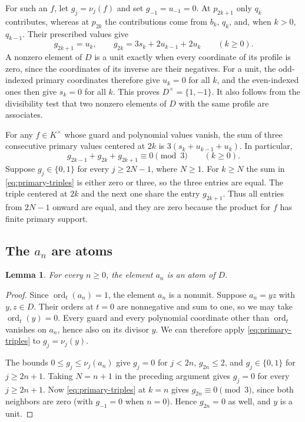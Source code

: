 \documentclass{article}
\DeclareMathOperator{\ord}{ord}
\newtheorem{lemma}[proposition]{Lemma}
\theoremstyle{remark}
\begin{document}
For such an $f$, let $g_j = \nu_j(f)$ and set $g_{-1} = u_{-1} = 0$.
At $p_{2k + 1}$ only $q_k$ contributes, whereas at $p_{2k}$ the contributions come from $b_k$, $q_k$, and, when $k > 0$, $q_{k - 1}$.
Their prescribed values give
\[
    g_{2k + 1} = u_k, \qquad
    g_{2k} = 3s_k + 2u_{k - 1} + 2u_k
    \qquad (k \ge 0).
\]
A nonzero element of $D$ is a unit exactly when every coordinate of its profile is zero, since the coordinates of its inverse are their negatives.
For a unit, the odd-indexed primary coordinates therefore give $u_k = 0$ for all $k$, and the even-indexed ones then give $s_k = 0$ for all $k$.
This proves $D^\times = \{1, -1\}$.
It also follows from the divisibility test that two nonzero elements of $D$ with the same profile are associates.

For any $f \in K^\times$ whose guard and polynomial values vanish, the sum of three consecutive primary values centered at $2k$ is $3(s_k + u_{k - 1} + u_k)$.
In particular,
\begin{equation}
    \label{eq:primary-triples}
    g_{2k - 1} + g_{2k} + g_{2k + 1} \equiv 0 \pmod{3}
    \qquad (k \ge 0).
\end{equation}
Suppose $g_j \in \{0, 1\}$ for every $j \ge 2N - 1$, where $N \ge 1$.
For $k \ge N$ the sum in \eqref{eq:primary-triples} is either zero or three, so the three entries are equal.
The triple centered at $2k$ and the next one share the entry $g_{2k + 1}$.
Thus all entries from $2N - 1$ onward are equal, and they are zero because the product for $f$ has finite primary support.

\subsection{The $a_n$ are atoms}

\begin{lemma}
    \label{lem:atoms-an}
    For every $n \ge 0$, the element $a_n$ is an atom of $D$.
\end{lemma}

\begin{proof}
    Since $\ord_t(a_n) = 1$, the element $a_n$ is a nonunit.
    Suppose $a_n = yz$ with $y, z \in D$.
    Their orders at $t = 0$ are nonnegative and sum to one, so we may take $\ord_t(y) = 0$.
    Every guard and every polynomial coordinate other than $\ord_t$ vanishes on $a_n$, hence also on its divisor $y$.
    We can therefore apply \eqref{eq:primary-triples} to $g_j = \nu_j(y)$.

    The bounds $0 \le g_j \le \nu_j(a_n)$ give $g_j = 0$ for $j < 2n$, $g_{2n} \le 2$, and $g_j \in \{0, 1\}$ for $j \ge 2n + 1$.
    Taking $N = n + 1$ in the preceding argument gives $g_j = 0$ for every $j \ge 2n + 1$.
    Now \eqref{eq:primary-triples} at $k = n$ gives $g_{2n} \equiv 0 \pmod{3}$, since both neighbors are zero (with $g_{-1} = 0$ when $n = 0$).
    Hence $g_{2n} = 0$ as well, and $y$ is a unit.
\end{proof}
\end{document}
